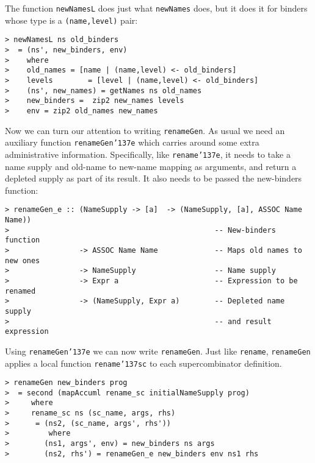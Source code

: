 %
%
\par
The function \mbox{\tt newNamesL} does just what \mbox{\tt newNames} does, but it does
it for binders whose type is a \mbox{\tt (name,level)} pair:
\begin{verbatim}
> newNamesL ns old_binders
>  = (ns', new_binders, env)
>    where
>    old_names = [name | (name,level) <- old_binders]
>    levels        = [level | (name,level) <- old_binders]
>    (ns', new_names) = getNames ns old_names
>    new_binders =  zip2 new_names levels
>    env = zip2 old_names new_names
\end{verbatim}
%
\par
Now we can turn our attention to writing \mbox{\tt renameGen}.  As usual we
need an auxiliary function \mbox{\tt renameGen{\char'137}e} which carries around some
extra administrative information.  Specifically, like \mbox{\tt rename{\char'137}e}, it needs to
take a name supply and old-name to new-name mapping as arguments, and
return a depleted supply as part of its result.  It also needs to be
passed the new-binders function:
\begin{verbatim}
> renameGen_e :: (NameSupply -> [a]  -> (NameSupply, [a], ASSOC Name Name))
>                                               -- New-binders function
>                -> ASSOC Name Name             -- Maps old names to new ones
>                -> NameSupply                  -- Name supply
>                -> Expr a                      -- Expression to be renamed
>                -> (NameSupply, Expr a)        -- Depleted name supply
>                                               -- and result expression
\end{verbatim}
\par
Using \mbox{\tt renameGen{\char'137}e} we can now write \mbox{\tt renameGen}.
Just like \mbox{\tt rename},  \mbox{\tt renameGen}
applies a local function \mbox{\tt rename{\char'137}sc} to each supercombinator definition.
\begin{verbatim}
> renameGen new_binders prog
>  = second (mapAccuml rename_sc initialNameSupply prog)
>     where
>     rename_sc ns (sc_name, args, rhs)
>      = (ns2, (sc_name, args', rhs'))
>         where
>        (ns1, args', env) = new_binders ns args
>        (ns2, rhs') = renameGen_e new_binders env ns1 rhs
\end{verbatim}
%


